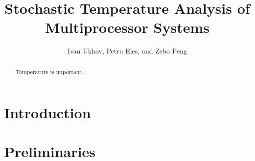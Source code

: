 \documentclass[conference]{IEEEtran}
\begin{document}
  \title{Stochastic Temperature Analysis of\\Multiprocessor Systems}
  \author{Ivan Ukhov, Petru Eles, and Zebo Peng}

  \author{
    \and
    \and
  }

  \maketitle

  \begin{abstract}
    Temperature is important.
  \end{abstract}

  \section{Introduction}
  

  \section{Preliminaries}
  

  
  
\end{document}

